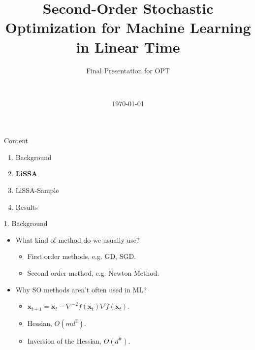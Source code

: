 \documentclass[pdf]{beamer}
\title[Second-Order Stochastic Optimization for Machine Learning in Linear Time]{Second-Order Stochastic Optimization for Machine Learning in Linear Time}
\subtitle{Final Presentation for OPT}
\author[Yue Zhao]{
	\large
	\\
}
\institute{
\\
\large
	Yue Zhao\\ 
201611130148
\\
}
\theoremstyle{remark}
\theoremstyle{definition}
\begin{document}
	

\date{\today}

\begin{noheadline}
\begin{frame}\maketitle\end{frame}
\end{noheadline}


\begin{frame}{Content}
\begin{enumerate}
	\item Background
	\item \textbf{LiSSA}
	\item LiSSA-Sample
	\item Results
\end{enumerate}
\end{frame}

\begin{frame}{1. Background}
\begin{itemize}
	\item What kind of method do we usually use?
	\begin{itemize}
		\item First order methods, e.g. GD, SGD.
		\item Second order method, e.g. Newton Method.
	\end{itemize}
	\item Why SO methods aren't often used in ML?
	\begin{itemize}
		\item $\mathbf{x}_{t+1}=\mathbf{x}_{t}-\nabla^{-2} f\left(\mathbf{x}_{t}\right) \nabla f\left(\mathbf{x}_{t}\right).$
		\item Hessian, $O(md^{2})$.
		\item Inversion of the Hessian, $O(d^w)$.
	\end{itemize}
\end{itemize}
\end{frame}
\end{document}
